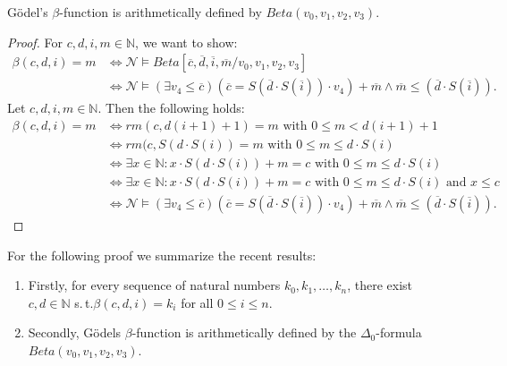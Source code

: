 \begin{lem}
G\"odel's $\beta$-function is arithmetically defined by $\mathit{Beta}(v_0, v_1, v_2, v_3)$.
\end{lem}
\begin{proof}
For $c,d,i,m \in \mathbb{N}$, we want to show:
\begin{align*}
\beta(c,d,i) = m & \Leftrightarrow
\mathcal{N} \vDash {Beta}[\overline{c}, \overline{d}, \overline{i}, \overline{m}/v_0, v_1, v_2, v_3] \\
& \Leftrightarrow  \mathcal{N} \vDash (\exists v_4 \le \overline{c})(\overline{c}=S(\overline{d}\cdot S (\overline{i})) \cdot v_4 ) + \overline{m} \wedge \overline{m} \le (\overline{d} \cdot S (\overline{i})).
\end{align*}
Let $c,d,i,m \in \mathbb{N}$. Then the following holds:
\begin{align*}
\beta(c,d,i) = m & \Leftrightarrow \mathit{rm}(c,d(i+1)+1)=m \text{ with }0 \le m < d(i+1)+1\\
& \Leftrightarrow \mathit{rm}(c,S(d \cdot S(i)) = m \text{ with }0 \le m \le d \cdot S(i)\\
& \Leftrightarrow \exists x \in \mathbb{N}: x \cdot S(d \cdot S(i))+m = c \text{ with }0 \le m \le d \cdot S(i)\\
& \Leftrightarrow \exists x \in \mathbb{N}: x \cdot S(d \cdot S(i))+m = c \text{ with }0 \le m \le d \cdot S(i) \text{ and } x \le c \\
& \Leftrightarrow  \mathcal{N} \vDash (\exists v_4 \le \overline{c})(\overline{c}=S(\overline{d}\cdot S (\overline{i})) \cdot v_4 ) + \overline{m} \wedge \overline{m} \le (\overline{d} \cdot S (\overline{i})).
\end{align*}
\end{proof}

For the following proof we summarize the recent results:
\begin{enumerate}
\item Firstly, for every sequence of natural numbers $k_0, k_1, \ldots,k_n$, there exist $c, d \in \mathbb{N}$ s.\,t.\@ $\beta(c,d,i) = k_i$ for all $0 \le i \le n$.
\item Secondly, G\"odels $\beta$-function is arithmetically defined by the $\Delta_0$-formula \\ $\mathit{Beta}(v_0, v_1, v_2, v_3)$.
\end{enumerate}



